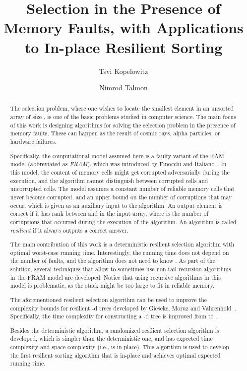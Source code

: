 \documentclass{llncs}
\begin{document}
\title{Selection in the Presence of Memory Faults, with Applications to In-place Resilient Sorting}
\author{
    Tsvi Kopelowitz
    \and
    Nimrod Talmon}
\maketitle


\begin{abstract}

The selection problem, where one wishes to locate the  smallest element in an unsorted array of size , is one of the basic problems studied in computer science. The main focus of this work is designing algorithms for solving the selection problem in the presence of memory faults. These can happen as the result of cosmic rays, alpha particles, or hardware failures.

Specifically, the computational model assumed here is a faulty variant of the RAM model (abbreviated as \emph{FRAM}), which was introduced by Finocchi and Italiano~\cite{resilient_data_structures}. In this model, the content of memory cells might get corrupted adversarially during the execution, and the algorithm cannot distinguish between corrupted cells and uncorrupted cells. The model assumes a constant number of reliable memory cells that never become corrupted, and an upper bound  on the number of corruptions that may occur, which is given as an auxiliary input to the algorithm. An output element is correct if it has rank between  and  in the input array, where  is the number of corruptions that occurred during the execution of the algorithm. An algorithm is called \emph{resilient} if it always outputs a correct answer.

The main contribution of this work is a deterministic resilient selection algorithm with optimal  worst-case running time. Interestingly, the running time does not depend on the number of faults, and the algorithm does not need to know . As part of the solution, several techniques that allow to sometimes use non-tail recursion algorithms in the FRAM model are developed. Notice that using recursive algorithms in this model is problematic, as the stack might be too large to fit in reliable memory.

The aforementioned resilient selection algorithm can be used to improve the complexity bounds for resilient -d trees developed by Gieseke, Moruz and Vahrenhold~\cite{kd_trees}. Specifically, the time complexity for constructing a -d tree is improved from  to .

Besides the deterministic algorithm, a randomized resilient selection algorithm is developed, which is simpler than the deterministic one, and has  expected time complexity and  space complexity (i.e., is in-place). This algorithm is used to develop the first resilient sorting algorithm that is in-place and achieves optimal  expected running time.
\end{abstract}
\end{document}
